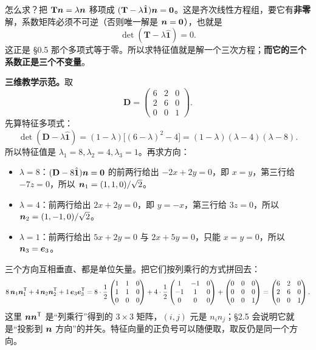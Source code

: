\documentclass[11pt]{ctexart}
\newcommand{\ten}[1]{\mathbf{#1}}
\newcommand{\unitd}{\hat{\ten{1}}}
\begin{document}
怎么求？把 $\ten T\vect n=\lambda\vect n$ 移项成 $(\ten T-\lambda\unitd)\vect n=\vect0$。这是齐次线性方程组，要它有\textbf{非零}解，系数矩阵必须不可逆（否则唯一解是 $\boldsymbol{n}=\boldsymbol{0}$），也就是
\[
\det(\ten T-\lambda\unitd)=0 .
\]
这正是 §0.5 那个多项式等于零。所以求特征值就是解一个三次方程；\textbf{而它的三个系数正是三个不变量}。

\textbf{三维教学示范。}取
\[
\ten D=\begin{pmatrix}6&2&0\\2&6&0\\0&0&1\end{pmatrix}.
\]
先算特征多项式：
\[
\det(\ten D-\lambda\unitd)
=(1-\lambda)\bigl[(6-\lambda)^2-4\bigr]
=(1-\lambda)(\lambda-4)(\lambda-8).
\]
所以特征值是 $\lambda_1=8,\lambda_2=4,\lambda_3=1$。再求方向：
\begin{itemize}
\item $\lambda=8$：$(\ten D-8\unitd)\vect n=\vect0$ 的前两行给出 $-2x+2y=0$，即 $x=y$，第三行给 $-7z=0$，所以 $\boldsymbol{n}_1=(1,1,0)/\sqrt2$。
\item $\lambda=4$：前两行给出 $2x+2y=0$，即 $y=-x$，第三行给 $3z=0$，所以 $\boldsymbol{n}_2=(1,-1,0)/\sqrt2$。
\item $\lambda=1$：前两行给出 $5x+2y=0$ 与 $2x+5y=0$，只能 $x=y=0$，所以 $\boldsymbol{n}_3=\boldsymbol{e}_3$。
\end{itemize}
三个方向互相垂直、都是单位矢量。把它们按列乘行的方式拼回去：
\[
8\,\boldsymbol{n}_1\boldsymbol{n}_1^{\mathsf T}+4\,\boldsymbol{n}_2\boldsymbol{n}_2^{\mathsf T}+1\,\boldsymbol{e}_3\boldsymbol{e}_3^{\mathsf T}
=8\cdot\frac12\begin{pmatrix}1&1&0\\1&1&0\\0&0&0\end{pmatrix}
+4\cdot\frac12\begin{pmatrix}1&-1&0\\-1&1&0\\0&0&0\end{pmatrix}
+\begin{pmatrix}0&0&0\\0&0&0\\0&0&1\end{pmatrix}
=\begin{pmatrix}6&2&0\\2&6&0\\0&0&1\end{pmatrix}.
\]
这里 $\boldsymbol{n}\boldsymbol{n}^{\mathsf T}$ 是“列乘行”得到的 $3\times3$ 矩阵，$(i,j)$ 元是 $n_in_j$；§2.5 会说明它就是“投影到 $\boldsymbol{n}$ 方向”的并矢。特征向量的正负号可以随便取，取反仍是同一个方向。
\end{document}
